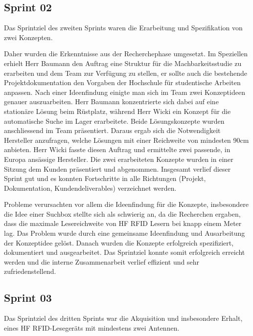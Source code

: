 \subsection{Sprint 02}
Das Sprintziel des zweiten Sprints waren die Erarbeitung und Spezifikation von zwei Konzepten.

Daher wurden die Erkenntnisse aus der Recherchephase umgesetzt. Im Speziellen erhielt Herr Baumann den Auftrag eine Struktur für die Machbarkeitsstudie zu erarbeiten und dem Team zur Verfügung zu stellen, er sollte auch die bestehende Projektdokumentation den Vorgaben der Hochschule für studentische Arbeiten anpassen. Nach einer Ideenfindung einigte man sich im Team zwei Konzeptideen genauer auszuarbeiten. Herr Baumann konzentrierte sich dabei auf eine stationäre Lösung beim Rüstplatz, während Herr Wicki ein Konzept für die automatische Suche im Lager erarbeitete. Beide Lösungskonzepte wurden anschliessend im Team präsentiert. Daraus ergab sich die Notwendigkeit Hersteller anzufragen, welche Lösungen mit einer Reichweite von mindesten 90cm anbieten. Herr Wicki fasste diesen Auftrag und ermittelte zwei passende, in Europa ansässige Hersteller. Die zwei erarbeiteten Konzepte wurden in einer Sitzung dem Kunden präsentiert und abgenommen. Insgesamt verlief dieser Sprint gut und es konnten Fortschritte in alle Richtungen (Projekt, Dokumentation, Kundendeliverables) verzeichnet werden.

Probleme verursachten vor allem die Ideenfindung für die Konzepte, insbesondere die Idee einer Suchbox stellte sich als schwierig an, da die Recherchen ergaben, dass die maximale Lesereichweite von HF RFID Lesern bei knapp einem Meter lag. Das Problem wurde durch eine gemeinsame Ideenfindung und Ausarbeitung der Konzeptidee gelöst. Danach wurden die Konzepte erfolgreich spezifiziert, dokumentiert und ausgearbeitet. Das Sprintziel konnte somit erfolgreich erreicht werden und die interne Zusammenarbeit verlief effizient und sehr zufriedenstellend.

\subsection{Sprint 03}
Das Sprintziel des dritten Sprints war die Akquisition und insbesondere Erhalt, eines HF RFID-Lesegeräts mit mindestens zwei Antennen.

